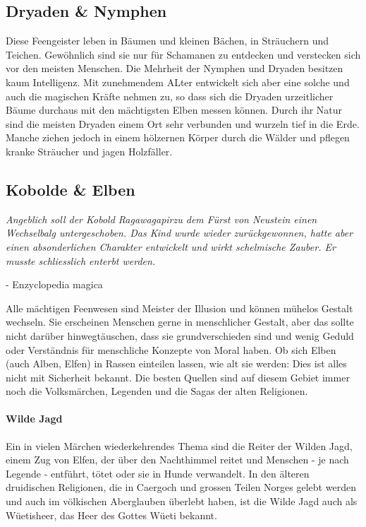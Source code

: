 \documentclass[10pt,twoside,twocolumn,openany]{book}
\begin{document}
\begin{multicols}{2}

\subsection{Dryaden \& Nymphen}
Diese Feengeister leben in Bäumen und kleinen Bächen, in Sträuchern und Teichen. Gewöhnlich sind sie nur für Schamanen zu entdecken und verstecken sich vor den meisten Menschen. Die Mehrheit der Nymphen und Dryaden besitzen kaum Intelligenz. Mit zunehmendem ALter entwickelt sich aber eine solche und auch die magischen Kräfte nehmen zu, so dass sich die Dryaden urzeitlicher Bäume durchaus mit den mächtigsten Elben messen können.
Durch ihr Natur sind die meisten Dryaden einem Ort sehr verbunden und wurzeln tief in die Erde. Manche ziehen jedoch in einem hölzernen Körper durch die Wälder und pflegen kranke Sträucher und jagen Holzfäller.

\subsection{Kobolde \& Elben}
\textit{Angeblich soll der Kobold Ragawagapirzu dem Fürst von Neustein einen Wechselbalg untergeschoben. Das Kind wurde wieder zurückgewonnen, hatte aber einen absonderlichen Charakter entwickelt und wirkt schelmische Zauber. Er musste schliesslich enterbt werden.}
\begin{flushright}
	- Enzyclopedia magica
\end{flushright}

Alle mächtigen Feenwesen sind Meister der Illusion und können mühelos Gestalt wechseln. Sie erscheinen Menschen gerne in menschlicher Gestalt, aber das sollte nicht darüber hinwegtäuschen, dass sie grundverschieden sind und wenig Geduld oder Verständnis für menschliche Konzepte von Moral haben. Ob sich Elben (auch Alben, Elfen) in Rassen einteilen lassen, wie alt sie werden: Dies ist alles nicht mit Sicherheit bekannt. Die besten Quellen sind auf diesem Gebiet immer noch die Volksmärchen, Legenden und die Sagas der alten Religionen.

\paragraph{Wilde Jagd} Ein in vielen Märchen wiederkehrendes Thema sind die Reiter der Wilden Jagd, einem Zug von Elfen, der über den Nachthimmel reitet und Menschen - je nach Legende - entführt, tötet oder  sie in Hunde verwandelt. In den älteren druidischen Religionen, die in Caergoch und grossen Teilen Norges gelebt werden und auch im völkischen Aberglauben überlebt haben, ist die Wilde Jagd auch als Wüetisheer, das Heer des Gottes Wüeti bekannt.
	
	


\end{multicols}
\end{document}
